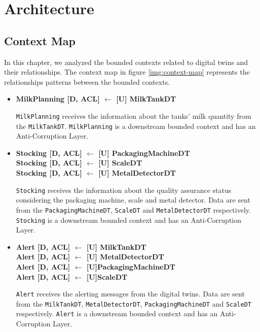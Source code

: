 \chapter{Architecture}

\section{Context Map}
In this chapter, we analyzed the bounded contexts related to digital twins and their relationships.
The context map in figure \ref{img:context-map} represents the relationships patterns between the bounded contexts.

\begin{itemize}
    \item \textbf{MilkPlanning [D, ACL] $\leftarrow$ [U] MilkTankDT}
    
    \texttt{MilkPlanning} receives the information about the tanks' milk quantity from the \texttt{MilkTankDT}.
    \texttt{MilkPlanning} is a downstream bounded context and has an Anti-Corruption Layer.
    
    \item \textbf{Stocking [D, ACL] $\leftarrow$ [U] PackagingMachineDT \\ 
    Stocking [D, ACL] $\leftarrow$ [U] ScaleDT \\ 
    Stocking [D, ACL] $\leftarrow$ [U] MetalDetectorDT}

    \texttt{Stocking} receives the information about the quality assurance status considering the packaging machine, scale and metal detector. Data are sent from the \texttt{PackagingMachineDT}, \texttt{ScaleDT} and \texttt{MetalDetectorDT} respectively.
    \texttt{Stocking} is a downstream bounded context and has an Anti-Corruption Layer.
	
	\item \textbf{Alert [D, ACL] $\leftarrow$ [U] MilkTankDT \\
	Alert [D, ACL] $\leftarrow$ [U] MetalDetectorDT \\
	Alert [D, ACL] $\leftarrow$ [U]PackagingMachineDT \\
	Alert [D, ACL] $\leftarrow$ [U]ScaleDT}

    \texttt{Alert} receives the alerting messages from the digital twins. Data are sent from the \texttt{MilkTankDT}, \texttt{MetalDetectorDT}, \texttt{PackagingMachineDT} and \texttt{ScaleDT} respectively.
    \texttt{Alert} is a downstream bounded context and has an Anti-Corruption Layer.


\end{itemize}
